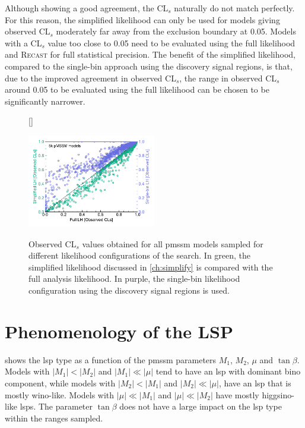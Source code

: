 Although showing a good agreement, the CL$_s$ naturally do not match perfectly. For this reason, the simplified likelihood can only be used for models giving observed CL$_s$ moderately far away from the exclusion boundary at 0.05. Models with a CL$_s$ value too close to 0.05 need to be evaluated using the full likelihood and \textsc{Recast} for full statistical precision. The benefit of the simplified likelihood, compared to the single-bin approach using the discovery signal regions, is that, due to the improved agreement in observed CL$_s$, the range in observed CL$_s$ around 0.05 to be evaluated using the full likelihood can be chosen to be significantly narrower.
\begin{figure}[H]
[\FBwidth]
{\caption{Observed CL$_s$ values obtained for all \gls{pmssm} models sampled for different likelihood configurations of the \onelepton search. In green, the simplified likelihood discussed in \cref{ch:simplify} is compared with the full analysis likelihood. In purple, the single-bin likelihood configuration using the discovery signal regions is used.}\label{fig:validation_simplified_full_likelihood}}
{\includegraphics[width=0.5\textwidth]{fig_scatter_likelihoods}}
\end{figure}

\FloatBarrier

\section{Phenomenology of the LSP}

 shows the \gls{lsp} type as a function of the \gls{pmssm} parameters $M_1$, $M_2$, $\mu$ and $\tan\beta$. Models with $\vert M_1\vert < \vert M_2\vert$ and $\vert M_1\vert \ll \vert\mu\vert$ tend to have an \gls{lsp} with dominant bino component, while models with $\vert M_2 \vert < \vert M_1 \vert$ and $ \vert M_2 \vert  \ll \vert\mu\vert$, have an \gls{lsp} that is mostly wino-like.
Models with $\vert\mu\vert\ll \vert M_1 \vert$ and $\vert\mu\vert\ll \vert M_2 \vert$ have mostly higgsino-like \glspl{lsp}.
The parameter $\tan\beta$ does not have a large impact on the \gls{lsp} type within the ranges sampled.

